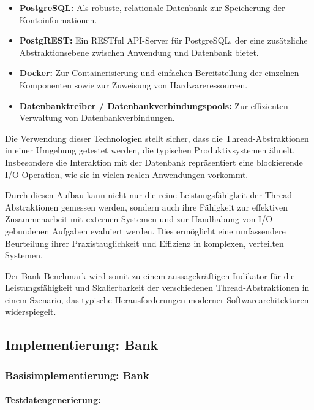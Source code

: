 \documentclass[fontsize=12pt,paper=a4,twoside=semi,parskip=half-,headsepline,headinclude]{scrreprt}
\begin{document}
\begin{itemize}
	\item \textbf{PostgreSQL:} Als robuste, relationale Datenbank zur Speicherung der Kontoinformationen.
	\item \textbf{PostgREST:} Ein RESTful API-Server für PostgreSQL, der eine zusätzliche Abstraktionsebene zwischen Anwendung und Datenbank bietet.
	\item \textbf{Docker:} Zur Containerisierung und einfachen Bereitstellung der einzelnen Komponenten sowie zur Zuweisung von Hardwareressourcen.
	\item \textbf{Datenbanktreiber / Datenbankverbindungspools:} Zur effizienten Verwaltung von Datenbankverbindungen.
\end{itemize}

Die Verwendung dieser Technologien stellt sicher, dass die Thread-Abs\-trak\-tio\-nen in einer Umgebung getestet werden, die typischen Produktivsystemen ähnelt. Insbesondere die Interaktion mit der Datenbank repräsentiert eine blockierende I/O-Operation, wie sie in vielen realen Anwendungen vorkommt.

Durch diesen Aufbau kann nicht nur die reine Leistungsfähigkeit der Thread-Abs\-trak\-tio\-nen gemessen werden, sondern auch ihre Fähigkeit zur effektiven Zusammenarbeit mit externen Systemen und zur Handhabung von I/O-gebundenen Aufgaben evaluiert werden. Dies ermöglicht eine umfassendere Beurteilung ihrer Praxistauglichkeit und Effizienz in komplexen, verteilten Systemen.

Der Bank-Benchmark wird somit zu einem aussagekräftigen Indikator für die Leistungsfähigkeit und Skalierbarkeit der verschiedenen Thread-Abstraktionen in einem Szenario, das typische Herausforderungen moderner Softwarearchitekturen widerspiegelt.

\subsection{Implementierung: Bank}

\subsubsection{Basisimplementierung: Bank}

\paragraph{Testdatengenerierung:}
\label{para:datagenerator}
\end{document}
